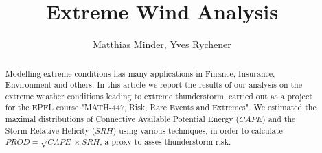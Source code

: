 \documentclass[10pt,conference,compsocconf]{IEEEtran}
\begin{document}
\title{Extreme Wind Analysis}

\author{
	Matthias Minder, Yves Rychener
}

\maketitle


\begin{abstract}
Modelling extreme conditions has many applications in Finance, Insurance, Environment and others. In this article we report the results of our analysis on the extreme weather conditions leading to extreme thunderstorm, carried out as a project for the EPFL course "MATH-447, Risk, Rare Events and Extremes". We estimated the maximal distributions of Connective Available Potential Energy ($CAPE$) and the Storm Relative Helicity ($SRH$) using various techniques, in order to calculate $PROD = \sqrt{CAPE} \times SRH$, a proxy to asses thunderstorm risk.
\end{abstract}
\end{document}
